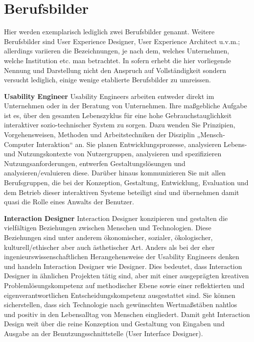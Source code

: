 \section*{Berufsbilder\label{/mi-2017/modulbeschreibungen-master/schwerpunkt-human-computer-interaction}}\label{berufsbilderpathlabelmi-2017modulbeschreibungen-masterschwerpunkt-human-computer-interaction}

Hier werden exemplarisch lediglich zwei Berufsbilder genannt. Weitere
Berufsbilder sind User Experience Designer, User Experience Architect
u.v.m.; allerdings variieren die Bezeichnungen, je nach dem, welches
Unternehmen, welche Institution etc. man betrachtet. In sofern erhebt
die hier vorliegende Nennung und Darstellung nicht den Anspruch auf
Vollständigkeit sondern versucht lediglich, einige wenige etablierte
Berufsbilder zu umreissen.

\textbf{Usability Engineer} Usability Engineers arbeiten entweder direkt
im Unternehmen oder in der Beratung von Unternehmen. Ihre maßgebliche
Aufgabe ist es, über den gesamten Lebenszyklus für eine hohe
Gebrauchstauglichkeit interaktiver sozio-technischer System zu sorgen.
Dazu wenden Sie Prinzipien, Vorgehensweisen, Methoden und
Arbeitstechniken der Disziplin „Mensch-Computer Interaktion`` an. Sie
planen Entwicklungsprozesse, analysieren Lebens- und Nutzungskontexte
von Nutzergruppen, analysieren und spezifizieren Nutzungsanforderungen,
entwerfen Gestaltungslösungen und analysieren/evaluieren diese. Darüber
hinaus kommunizieren Sie mit allen Berufsgruppen, die bei der
Konzeption, Gestaltung, Entwicklung, Evaluation und dem Betrieb dieser
interaktiven Systeme beteiligt sind und übernehmen damit quasi die Rolle
eines Anwalts der Benutzer.

\textbf{Interaction Designer} Interaction Designer konzipieren und
gestalten die vielfältigen Beziehungen zwischen Menschen und
Technologien. Diese Beziehungen sind unter anderem ökonomischer,
sozialer, ökologischer, kulturell/ethischer aber auch ästhetischer Art.
Anders als bei der eher ingenieurswissenschaftlichen Herangehensweise
der Usability Engineers denken und handeln Interaction Designer wie
Designer. Dies bedeutet, dass Interaction Designer in ähnlichen
Projekten tätig sind, aber mit einer ausgeprägten kreativen
Problemlösungskompetenz auf methodischer Ebene sowie einer reflektierten
und eigenverantwortlichen Entscheidungskompetenz ausgestattet sind. Sie
können sicherstellen, dass sich Technologie nach gewünschten
Wertmaßstäben nahtlos und positiv in den Lebensalltag von Menschen
eingliedert. Damit geht Interaction Design weit über die reine
Konzeption und Gestaltung von Eingaben und Ausgabe an der
Benutzungsschnittstelle (User Interface Designer).

